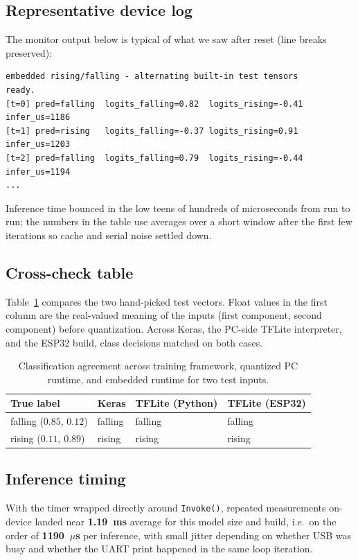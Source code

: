 \documentclass[11pt]{article}
\begin{document}
\subsection{Representative device log}
The monitor output below is typical of what we saw after reset (line breaks preserved):

\begin{verbatim}
embedded rising/falling - alternating built-in test tensors
ready.
[t=0] pred=falling  logits_falling=0.82  logits_rising=-0.41  infer_us=1186
[t=1] pred=rising   logits_falling=-0.37 logits_rising=0.91  infer_us=1203
[t=2] pred=falling  logits_falling=0.79  logits_rising=-0.44 infer_us=1194
...
\end{verbatim}

Inference time bounced in the low teens of hundreds of microseconds from run to run; the numbers in the table use averages over a short window after the first few iterations so cache and serial noise settled down.

\subsection{Cross-check table}
Table~\ref{tab:compare} compares the two hand-picked test vectors. Float values in the first column are the real-valued meaning of the inputs (first component, second component) before quantization. Across Keras, the PC-side TFLite interpreter, and the ESP32 build, class decisions matched on both cases.

\begin{table}[htbp]
  \centering
  \begin{tabular}{@{}llll@{}}
    \toprule
    True label & Keras & TFLite (Python) & TFLite (ESP32) \\
    \midrule
    falling ($0.85$, $0.12$) & falling & falling & falling \\
    rising  ($0.11$, $0.89$) & rising  & rising  & rising \\
    \bottomrule
  \end{tabular}
  \caption{Classification agreement across training framework, quantized PC runtime, and embedded runtime for two test inputs.}
  \label{tab:compare}
\end{table}

\subsection{Inference timing}
With the timer wrapped directly around \texttt{Invoke()}, repeated measurements on-device landed near \textbf{1.19~ms} average for this model size and build, i.e.\ on the order of \textbf{1190~$\mu$s} per inference, with small jitter depending on whether USB was busy and whether the UART print happened in the same loop iteration.
\end{document}
